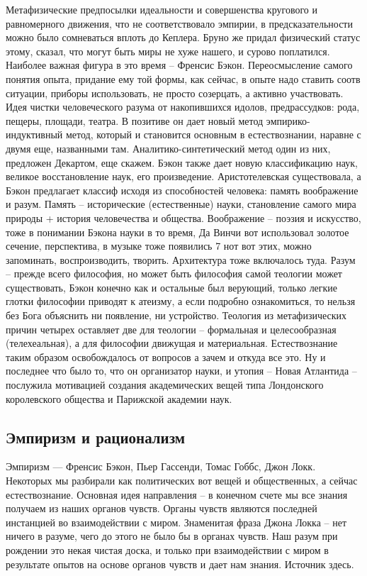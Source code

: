 \documentclass[a4paper, 12pt]{article}
\begin{document}
Метафизические предпосылки идеальности и совершенства кругового 
и равномерного движения, что не соответствовало эмпирии, 
в предсказательности можно было сомневаться вплоть до Кеплера. Бруно же 
придал физический статус этому, сказал, что могут быть миры не хуже 
нашего, и сурово поплатился. Наиболее важная фигура в это время -- 
Френсис Бэкон. Переосмысление самого понятия опыта, придание ему той 
формы, как сейчас, в опыте надо ставить соотв ситуации, приборы 
использовать, не просто созерцать, а активно участвовать. Идея чистки 
человеческого разума от накопившихся идолов, предрассудков: рода, 
пещеры, площади, театра. В позитиве он дает новый метод 
эмпирико-индуктивный метод, который и становится основным 
в естествознании, наравне с двумя еще, названными там. 
Аналитико-синтетический метод один из них, предложен Декартом, еще 
скажем. Бэкон также дает новую классификацию наук, великое 
восстановление наук, его произведение. Аристотелевская существовала, 
а Бэкон предлагает классиф исходя из способностей человека: память 
воображение и разум. Память -- исторические (естественные) науки, 
становление самого мира природы + история человечества и общества. 
Воображение -- поэзия и искусство, тоже в понимании Бэкона науки в то 
время, Да Винчи вот использовал золотое сечение, перспектива, в музыке 
тоже появились 7 нот вот этих, можно запоминать, воспроизводить, 
творить. Архитектура тоже включалось туда. Разум -- прежде всего 
философия, но может быть философия самой теологии может существовать, 
Бэкон конечно как и остальные был верующий, только легкие глотки 
философии приводят к атеизму, а если подробно ознакомиться, то нельзя 
без Бога объяснить ни появление, ни устройство. Теология из 
метафизических причин четырех оставляет две для теологии -- формальная 
и целесообразная (телехеальная), а для философии движущая 
и материальная. Естествознание таким образом освобождалось от вопросов 
а зачем и откуда все это. Ну и последнее что было то, что он организатор 
науки, и утопия -- Новая Атлантида -- послужила мотивацией создания 
академических вещей типа Лондонского королевского общества и Парижской 
академии наук.

\subsection{Эмпиризм и рационализм}

Эмпиризм --- Френсис Бэкон, Пьер Гассенди, Томас Гоббс, Джон Локк. 
Некоторых мы разбирали как политических вот вещей и общественных, 
а сейчас естествознание. Основная идея направления -- в конечном счете 
мы все знания получаем из наших органов чувств. Органы чувств являются 
последней инстанцией во взаимодействии с миром. Знаменитая фраза Джона 
Локка -- нет ничего в разуме, чего до этого не было бы в органах чувств. 
Наш разум при рождении это некая чистая доска, и только при 
взаимодействии с миром в результате опытов на основе органов чувств 
и дает нам знания. Источник здесь.
\end{document}
